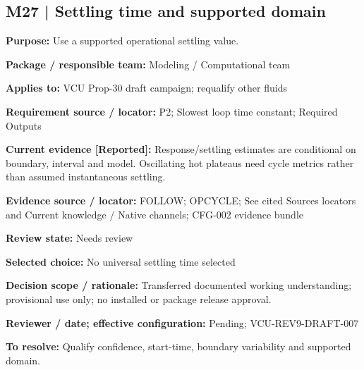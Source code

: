 \documentclass[11pt]{article}
\begin{document}
\par\noindent\begin{minipage}{\textwidth}\small\setlength{\parskip}{2pt}
\subsection*{M27 | Settling time and supported domain}
\textbf{Purpose:} Use a supported operational settling value.\par
\textbf{Package / responsible team:} Modeling / Computational team\par
\textbf{Applies to:} VCU Prop-30 draft campaign; requalify other fluids\par
\textbf{Requirement source / locator:} P2; Slowest loop time constant; Required Outputs\par
\textbf{Current evidence [Reported]:} Response/settling estimates are conditional on boundary, interval and model. Oscillating hot plateaus need cycle metrics rather than assumed instantaneous settling.\par
\textbf{Evidence source / locator:} FOLLOW; OPCYCLE; See cited Sources locators and Current knowledge / Native channels; CFG-002 evidence bundle\par
\textbf{Review state:} Needs review\par
\textbf{Selected choice:} No universal settling time selected\par
\textbf{Decision scope / rationale:} Transferred documented working understanding; provisional use only; no installed or package release approval.\par
\textbf{Reviewer / date; effective configuration:} Pending; VCU-REV9-DRAFT-007\par
\textbf{To resolve:} Qualify confidence, start-time, boundary variability and supported domain.\par
\end{minipage}\par\vspace{5pt}
\end{document}
